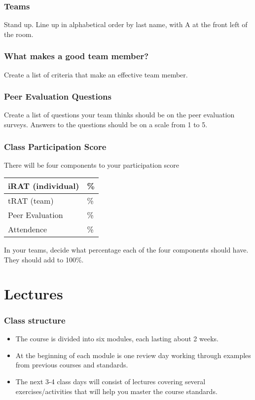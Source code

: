 {  \begin{frame}\frametitle{Teams}
  Stand up.  Line up in alphabetical order by last name, with A at the front left of the room.
  \vspace{4in}
  \end{frame}

  \begin{frame} \frametitle{What makes a good team member?}
  Create a list of criteria that make an effective team member.
  \vspace{4in}
  \end{frame}

  \begin{frame} \frametitle{Peer Evaluation Questions}
  Create a list of questions your team thinks should be on the peer evaluation surveys.  Answers to the questions should be on a scale from 1 to 5.
  \vspace{4in}
  \end{frame}

  \begin{frame} \frametitle{Class Participation Score}
  There will be four components to your participation score

  \begin{center}
  \begin{tabular}{l|l}
  \hline
  iRAT (individual) & \phantom{xxxx}\%   \\ \hline
  tRAT (team) & \phantom{xxxx}\%   \\ \hline
  Peer Evaluation & \phantom{xxxx}\%   \\ \hline
  Attendence & \phantom{xxxx}\%   \\ \hline
  \end{tabular}
  \end{center}


  In your teams, decide what percentage each of the four components should have.  They should add to 100\%.
  \end{frame}
}{
  \section{Lectures}
  \begin{frame} \frametitle{Class structure}
  \begin{itemize}
  \item The course is divided into six modules, each lasting about 2 weeks.
  \item At the beginning of each module is one review day working through
        examples from previous courses and standards.
  \item The next 3-4 class days will consist of lectures covering several
        exercises/activities that will help you master the course standards.
  \end{itemize}
  \end{frame}
}


